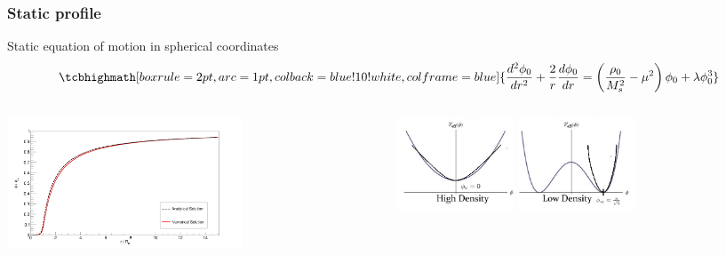 \documentclass[10pt,t,handout]{beamer}
\begin{document}
\begin{frame}
\frametitle{Static profile}
    \centering Static equation of motion in spherical coordinates
    \begin{equation*}
        \tcbhighmath[boxrule=2pt,arc=1pt,colback=blue!10!white,colframe=blue]{\frac{d^2\phi_0}{dr^2} + \frac{2}{r}\frac{d\phi_0}{dr} = \left(\frac{\rho_0}{M_s^2}-\mu^2 \right)\phi_0 +\lambda\phi_0^3}
    \end{equation*}
    
    \begin{columns}[T]
    \begin{column}{0.7\textwidth}
    \vspace{.7cm}
    \centering \includegraphics[width=7cm]{Images/Static.png}
    \end{column}
    
    \begin{column}{0.3\textwidth}
    \centering \includegraphics[width=3.5cm]{Images/11.jpg}
    \centering \includegraphics[width=3.5cm]{Images/22.jpg}
    \end{column}
    \end{columns}

    
\end{frame}
\end{document}
